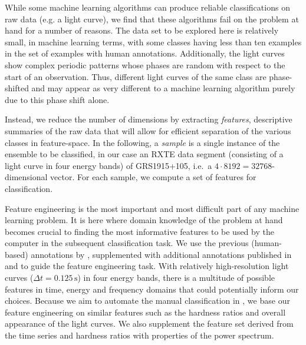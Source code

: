 \documentclass[fleqn,usenatbib]{mnras}
\begin{document}
While some machine learning algorithms can produce reliable classifications on raw data (e.g. a light curve), we find that these algorithms fail on the problem at hand for a number of reasons. The data set to be explored here is relatively small, in machine learning terms, with some classes having less than ten examples in the set of examples with human annotations. Additionally, the light curves show complex periodic patterns whose phases are random with respect to the start of an observation. Thus, different light curves of the same class are phase-shifted and may appear as very different to a machine learning algorithm purely due to this phase shift alone.

Instead, we reduce the number of dimensions by extracting \textit{features}, descriptive summaries of the raw data that will allow for efficient separation of the various classes in feature-space.
In the following, a \textit{sample} is a single instance of the ensemble to be classified, in our case an RXTE data segment (consisting of a light curve in four energy bands) of GRS1915+105, i.e.\ a $4 \cdot 8192 = 32768$-dimensional vector. For each sample, we compute a set of features for classification. %

Feature engineering is the most important and most difficult part of any machine learning problem. It is here where domain knowledge of the problem at hand becomes crucial to finding the most informative features to be used by the computer in the subsequent classification task. 
We use the previous (human-based) annotations by \citet{belloni2000}, supplemented with additional annotations published in \citet{kleinwolt2002} and \citet{hannikainen2003} to guide the feature engineering task. With relatively high-resolution light curves ($\Delta t = 0.125 \,\mathrm{s}$) in four energy bands, there is a multitude of possible features in time, energy and frequency domains that could potentially inform our choices. Because we aim to automate the manual classification in \citet{belloni2000}, we base our feature engineering on similar features such as the hardness ratios and overall appearance of the light curves. We also supplement the feature set derived from the time series and hardness ratios with properties of the power spectrum.
\end{document}

